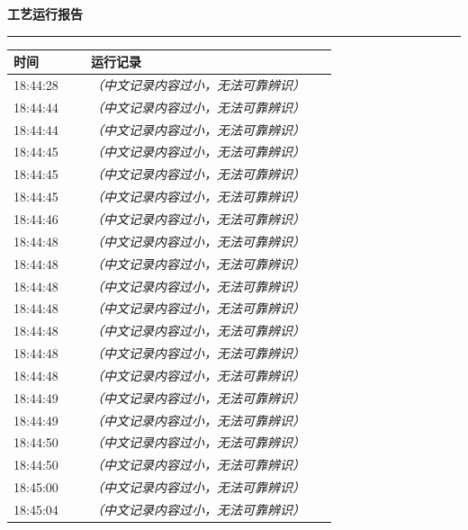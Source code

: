 \documentclass[UTF8,10pt,a4paper,fontset=fandol]{ctexart}
\begin{document}
\vspace{1em}

\noindent
\begin{minipage}[t]{0.47\linewidth}
\centering
\textbf{工艺运行报告}\\[-2pt]
\rule{\linewidth}{0.4pt}

\scriptsize
\begin{tabular}{|p{0.22\linewidth}|p{0.70\linewidth}|}
\hline
时间 & 运行记录 \\ \hline
18:44:28 & \textit{（中文记录内容过小，无法可靠辨识）} \\ \hline
18:44:44 & \textit{（中文记录内容过小，无法可靠辨识）} \\ \hline
18:44:44 & \textit{（中文记录内容过小，无法可靠辨识）} \\ \hline
18:44:45 & \textit{（中文记录内容过小，无法可靠辨识）} \\ \hline
18:44:45 & \textit{（中文记录内容过小，无法可靠辨识）} \\ \hline
18:44:45 & \textit{（中文记录内容过小，无法可靠辨识）} \\ \hline
18:44:46 & \textit{（中文记录内容过小，无法可靠辨识）} \\ \hline
18:44:48 & \textit{（中文记录内容过小，无法可靠辨识）} \\ \hline
18:44:48 & \textit{（中文记录内容过小，无法可靠辨识）} \\ \hline
18:44:48 & \textit{（中文记录内容过小，无法可靠辨识）} \\ \hline
18:44:48 & \textit{（中文记录内容过小，无法可靠辨识）} \\ \hline
18:44:48 & \textit{（中文记录内容过小，无法可靠辨识）} \\ \hline
18:44:48 & \textit{（中文记录内容过小，无法可靠辨识）} \\ \hline
18:44:48 & \textit{（中文记录内容过小，无法可靠辨识）} \\ \hline
18:44:49 & \textit{（中文记录内容过小，无法可靠辨识）} \\ \hline
18:44:49 & \textit{（中文记录内容过小，无法可靠辨识）} \\ \hline
18:44:50 & \textit{（中文记录内容过小，无法可靠辨识）} \\ \hline
18:44:50 & \textit{（中文记录内容过小，无法可靠辨识）} \\ \hline
18:45:00 & \textit{（中文记录内容过小，无法可靠辨识）} \\ \hline
18:45:04 & \textit{（中文记录内容过小，无法可靠辨识）} \\ \hline

\end{tabular}
\end{minipage}
\end{document}
